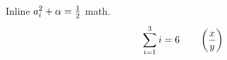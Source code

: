 Inline $a_i^2 + \alpha = {1\over 2}$ math.
$$\sum_{i=1}^{3} i = 6 \qquad \left({x\over y}\right)$$
\bye

